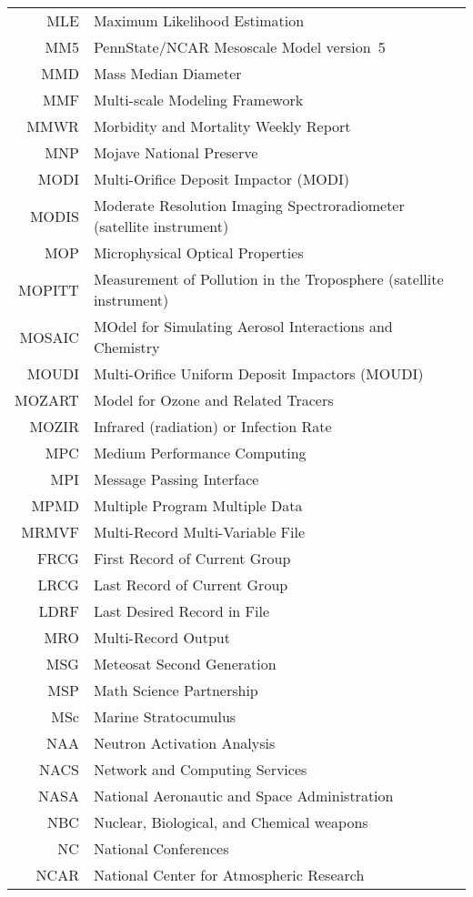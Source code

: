 \documentclass[12pt,twoside]{article}
\begin{document}
\begin{longtable}[>{\bfseries}l]{>{\ttfamily}r l}
MLE & Maximum Likelihood Estimation \\
MM5 & PennState/NCAR Mesoscale Model version~5 \\
MMD & Mass Median Diameter \\
MMF & Multi-scale Modeling Framework \\
MMWR & Morbidity and Mortality Weekly Report \\
MNP & Mojave National Preserve \\
MODI & Multi-Orifice Deposit Impactor (MODI) \\
MODIS &  Moderate Resolution Imaging Spectroradiometer (satellite instrument) \\
MOP & Microphysical Optical Properties \\
MOPITT & Measurement of Pollution in the Troposphere (satellite instrument) \\
MOSAIC & MOdel for Simulating Aerosol Interactions and Chemistry \\
MOUDI & Multi-Orifice Uniform Deposit Impactors (MOUDI) \\
MOZART & Model for Ozone and Related Tracers \\
MOZIR & Infrared (radiation) or Infection Rate \\
MPC & Medium Performance Computing \\
MPI & Message Passing Interface \\
MPMD & Multiple Program Multiple Data \\
MRMVF & Multi-Record Multi-Variable File \\
FRCG & First Record of Current Group \\
LRCG & Last Record of Current Group \\
LDRF & Last Desired Record in File \\
MRO & Multi-Record Output \\
MSG & Meteosat Second Generation \\
MSP & Math Science Partnership \\
MSc & Marine Stratocumulus \\
NAA & Neutron Activation Analysis \\
NACS & Network and Computing Services \\
NASA & National Aeronautic and Space Administration \\
NBC & Nuclear, Biological, and Chemical weapons \\
NC & National Conferences \\
NCAR & National Center for Atmospheric Research \\

\end{longtable}
\end{document}
